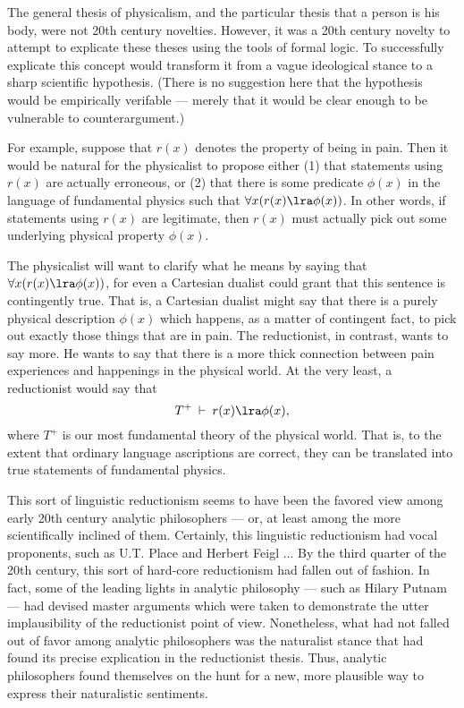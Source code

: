 The general thesis of physicalism, and the particular thesis that a
person is his body, were not 20th century novelties.  However, it was
a 20th century novelty to attempt to explicate these theses using the
tools of formal logic.  To successfully explicate this concept would
transform it from a vague ideological stance to a sharp scientific
hypothesis.  (There is no suggestion here that the hypothesis would be
empirically verifable --- merely that it would be clear enough to be
vulnerable to counterargument.)

For example, suppose that $r(x)$ denotes the property of being in
pain.  Then it would be natural for the physicalist to propose either
(1) that statements using $r(x)$ are actually erroneous, or (2) that
there is some predicate $\phi (x)$ in the language of fundamental
physics such that $\forall x(r(x)\lra \phi (x))$.  In other words, if
statements using $r(x)$ are legitimate, then $r(x)$ must actually pick
out some underlying physical property $\phi (x)$.

The physicalist will want to clarify what he means by saying that
$\forall x(r(x)\lra \phi (x))$, for even a Cartesian dualist could
grant that this sentence is contingently true.  That is, a Cartesian
dualist might say that there is a purely physical description
$\phi (x)$ which happens, as a matter of contingent fact, to pick out
exactly those things that are in pain.  The reductionist, in contrast,
wants to say more.  He wants to say that there is a more thick
connection between pain experiences and happenings in the physical
world.  At the very least, a reductionist would say that
\[ T^+\: \vdash \: r(x)\lra \phi (x) ,\] where $T^+$ is our most
fundamental theory of the physical world.  That is, to the extent that
ordinary language ascriptions are correct, they can be translated into
true statements of fundamental physics.

This sort of linguistic reductionism seems to have been the favored
view among early 20th century analytic philosophers --- or, at least
among the more scientifically inclined of them.  Certainly, this
linguistic reductionism had vocal proponents, such as U.T. Place and
Herbert Feigl ... By the third quarter of the 20th century, this sort
of hard-core reductionism had fallen out of fashion.  In fact, some of
the leading lights in analytic philosophy --- such as Hilary Putnam
--- had devised master arguments which were taken to demonstrate the
utter implausibility of the reductionist point of view.  Nonetheless,
what had not falled out of favor among analytic philosophers was the
naturalist stance that had found its precise explication in the
reductionist thesis.  Thus, analytic philosophers found themselves on
the hunt for a new, more plausible way to express their naturalistic
sentiments.

